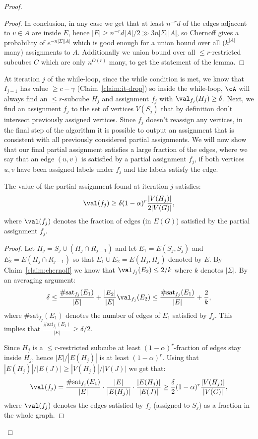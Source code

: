 \begin{proof}
\begin{proof}
In conclusion, in any case we get that at least $n^{-r}d$ of the edges adjacent to $v \in A$ are inside $E$, hence $|E| \geq n^{-r} d |A|/2 \gg 3n|\Sigma| |A|$, so Chernoff gives a probability of $e^{-n|\Sigma| |A|}$ which is good enough for
a union bound over all ($k^{|A|}$ many) assignments to $A$. Additionally we union bound over all $\leq r$-restricted subcubes $C$ which are only $n^{O(r)}$ many, to get the statement of the lemma.
\end{proof}

At iteration $j$ of the while-loop, since the while condition is met, we know that $I_{j-1}$ has value $\geq c - \gamma$ (Claim~\ref{claim:it-drop}) so inside the while-loop, $\cA$ will always find an $\leq r$-subcube $H_j$ and assignment $f_j$ with $\val_{f_j}(H_j) \geq \delta$. Next, we find an assignment $f_j$ to the set of vertices $V(S_j)$ that by definition don't intersect previously assigned vertices. Since $f_j$ doesn't reassign any vertices, in the final step of the algorithm it is possible to output an assignment that is consistent with all previously considered partial assignments. We will now show that our final partial assignment satisfies a large fraction of the edges, where we say that an edge $(u,v)$ is satisfied by a partial assignment $f_j$, if both vertices $u,v$ have been assigned labels under $f_j$ and the labels satisfy the edge.


\begin{claim}\label{claim:it-val}
The value of the partial assignment found at iteration $j$ satisfies:
\[\val(f_j) \geq \delta(1 - \alpha)^r\frac{|V(H_j)|}{2|V(G)|},\]
where $\val(f_j)$ denotes the fraction of edges (in $E(G)$) satisfied by the partial assignment $f_j$.
\end{claim}

\begin{proof}
Let $H_j = S_j \cup (H_j \cap R_{j-1})$ and let $E_1 = E(S_j,S_j)$ and $E_2 = E(H_j \cap R_{j-1})$ so that $E_1 \cup E_2 = E(H_j,H_j)$ denoted by $E$. By Claim~\ref{claim:chernoff} we know that $\val_{f_j}(E_2) \leq 2/k$ where $k$ denotes $|\Sigma|$. 
By an averaging argument:
\[\delta \leq \frac{\#\text{sat}_{f_j}(E_1)}{|E|}+ \frac{|E_2|}{|E|}\val_{f_j}(E_2) \leq \frac{\#\text{sat}_{f_j}(E_1)}{|E|} + \frac{2}{k},\]
where $\#\text{sat}_{f_j}(E_1)$ denotes the number of edges of $E_1$ satisfied by $f_j$. This implies that $\frac{\#\text{sat}_{f_j}(E_1)}{|E|} \geq \delta/2$. 

Since $H_j$ is a $\leq r$-restricted subcube at least $(1-\alpha)^r$-fraction of edges stay inside $H_j$, hence $|E|/|E(H_j)|$ is at least $(1-\alpha)^r$. Using that $|E(H_j)|/|E(J)| \geq |V(H_j)|/|V(J)|$ we get that: 
\[\val(f_j) =  \frac{\#\text{sat}_{f_j}(E_1)}{|E|} \cdot \frac{|E|}{|E(H_j)|} \cdot \frac{|E(H_j)|}{|E(J)|} \geq \frac{\delta}{2}(1 - \alpha)^r\frac{|V(H_j)|}{|V(G)|},\]
where $\val(f_j)$ denotes the edges satisfied by $f_j$ (assigned to $S_j$) as a fraction in the whole graph. 
\end{proof}


\end{proof}
